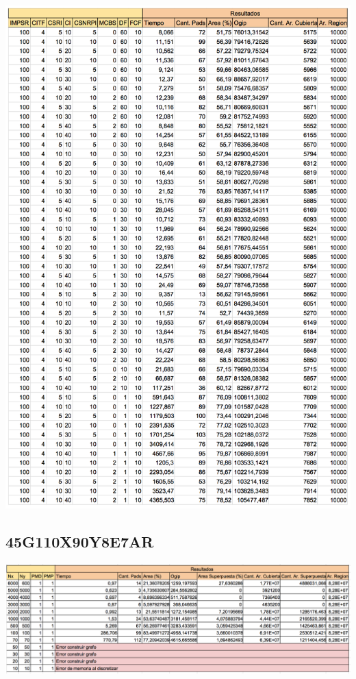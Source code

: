\begin{center}
\includegraphics[width=1\textwidth]{imagenes/inst2_V2}
\end{center}

\subsection{45G110X90Y8E7AR}

\begin{center}
\includegraphics[width=1\textwidth]{imagenes/S_45G110X90Y8E7AR}
\end{center}

